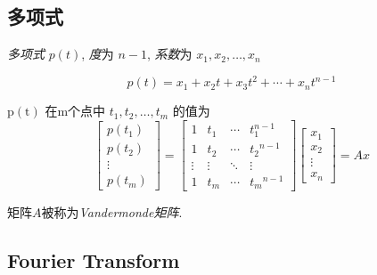 \subsection{多项式}

\begin{definition}[多项式]
    \textit{多项式} $ p(t) $, \textit{度}为 $ n-1 $, \textit{系数}为 $ x_{1}, x_{2}, \ldots, x_{n} $

    $$
p(t)=x_{1}+x_{2} t+x_{3} t^{2}+\cdots+x_{n} t^{n-1}
$$
\end{definition}

\begin{definition}
    $ \mathrm{p}(\mathrm{t}) $ 在m个点中 $ t_{1}, t_{2}, \ldots, t_{m} $ 的值为
    $$
    \left[\begin{array}{c}
    p\left(t_{1}\right) \\
    p\left(t_{2}\right) \\
    \vdots \\
    p\left(t_{m}\right)
    \end{array}\right]=\left[\begin{array}{cccc}
    1 & t_{1} & \cdots & t_{1}^{n-1} \\
    1 & t_{2} & \cdots & t_{2}{ }^{n-1} \\
    \vdots & \vdots & \ddots & \vdots \\
    1 & t_{m} & \cdots & t_{m}{ }^{n-1}
    \end{array}\right]\left[\begin{array}{c}
    x_{1} \\
    x_{2} \\
    \vdots \\
    x_{n}
    \end{array}\right]=A x
    $$

    矩阵$A$被称为\textit{Vandermonde矩阵}.
\end{definition}

\subsection{Fourier Transform}

